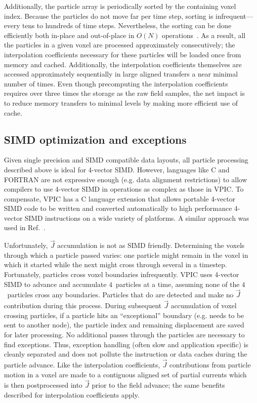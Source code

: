 \documentclass[journal,twoside]{IEEEtran}
\newcommand{\vecJ}{\vec{J}}
\begin{document}
Additionally, the particle array is periodically sorted by the
containing voxel index.  Because the particles do not move far per
time step, sorting is infrequent---every tens to hundreds of time
steps.  Nevertheless, the sorting can be done efficiently both
in-place and out-of-place in $O(N)$ operations~\cite{Bowers_2001}.  As
a result, all the particles in a given voxel are processed
approximately consecutively; the interpolation coefficients necessary
for these particles will be loaded once from memory and cached.
Additionally, the interpolation coefficients themselves are accessed
approximately sequentially in large aligned transfers a near minimal
number of times.  Even though precomputing the interpolation
coefficients requires over three times the storage as the raw field
samples, the net impact is to reduce memory transfers to minimal
levels by making more efficient use of cache.

\subsection{SIMD optimization and exceptions}

Given single precision and SIMD compatible data layouts, all particle
processing described above is ideal for 4-vector SIMD.  However,
languages like C and FORTRAN are not expressive enough (e.g. data
alignment restrictions) to allow compilers to use 4-vector SIMD in
operations as complex as those in VPIC.  To compensate, VPIC has a C
language extension that allows portable 4-vector SIMD code to be
written and converted automatically to high performance 4-vector SIMD
instructions on a wide variety of platforms.  A similar approach was
used in Ref.~\cite{Bowers_et_al_2006}.

Unfortunately, $\vecJ$ accumulation is not as SIMD friendly.
Determining the voxels through which a particle passed varies: one
particle might remain in the voxel in which it started while the next
might cross through several in a timestep.  Fortunately, particles
cross voxel boundaries infrequently.  VPIC uses 4-vector SIMD to
advance and accumulate $4$~particles at a time, assuming none of the
$4$~particles cross any boundaries.  Particles that do are detected
and make no $\vecJ$ contribution during this process.  During
subsequent $\vecJ$ accumulation of voxel crossing particles, if a
particle hits an ``exceptional'' boundary (e.g. needs to be sent to
another node), the particle index and remaining displacement are saved
for later processing.  No additional passes through the particles are
necessary to find exceptions.  Thus, exception handling (often slow
and application specific) is cleanly separated and does not pollute
the instruction or data caches during the particle advance.  Like the
interpolation coefficients, $\vecJ$ contributions from particle motion
in a voxel are made to a contiguous aligned set of partial currents
which is then postprocessed into $\vecJ$ prior to the field advance;
the same benefits described for interpolation coefficients apply.
\end{document}
